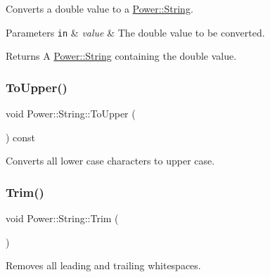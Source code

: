 Converts a double value to a \hyperlink{class_power_1_1_string}{Power\+::\+String}. 


\begin{DoxyParams}[1]{Parameters}
\mbox{\tt in}  & {\em value} & The double value to be converted. \\
\hline
\end{DoxyParams}
\begin{DoxyReturn}{Returns}
A \hyperlink{class_power_1_1_string}{Power\+::\+String} containing the double value. 
\end{DoxyReturn}
\mbox{\label{class_power_1_1_string_a9b4fbde0111caf61d777aec6b5becf59}} 
\subsubsection{\texorpdfstring{To\+Upper()}{ToUpper()}}
{\footnotesize\ttfamily void Power\+::\+String\+::\+To\+Upper (\begin{DoxyParamCaption}{ }\end{DoxyParamCaption}) const\hspace{0.3cm}{\ttfamily [inline]}}



Converts all lower case characters to upper case. 

\mbox{\label{class_power_1_1_string_adccf591064c5f8a4681930a01318e023}} 
\subsubsection{\texorpdfstring{Trim()}{Trim()}\hspace{0.1cm}{\footnotesize\ttfamily [1/2]}}
{\footnotesize\ttfamily void Power\+::\+String\+::\+Trim (\begin{DoxyParamCaption}{ }\end{DoxyParamCaption})\hspace{0.3cm}{\ttfamily [inline]}}



Removes all leading and trailing whitespaces. 

\mbox{\label{class_power_1_1_string_afd78e65baee3fdbd249616dd03ee6eaa}} 
